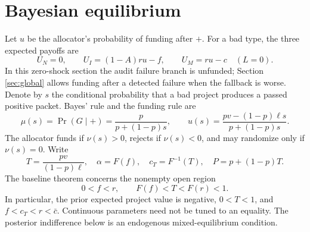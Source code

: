 \documentclass[11pt]{article}
\begin{document}
\section{Bayesian equilibrium}\label{sec:eq}
Let $u$ be the allocator's probability of funding after $+$. For a bad type, the three expected payoffs are
\begin{equation}U_N=0,\qquad U_I=(1-A)ru-f,\qquad U_M=ru-c\quad(L=0).\label{eq:payoffs}\end{equation}
In this zero-shock section the audit failure branch is unfunded; Section \ref{sec:global} allows funding after a detected failure when the fallback is worse. Denote by $s$ the conditional probability that a bad project produces a passed positive packet. Bayes' rule and the funding rule are
\begin{equation}\mu(s)=\Pr(G\mid+)=\frac{p}{p+(1-p)s},\qquad
u(s)=\frac{pv-(1-p)\ell s}{p+(1-p)s}.\label{eq:posterior}\end{equation}
The allocator funds if $\nu(s)>0$, rejects if $\nu(s)<0$, and may randomize only if $\nu(s)=0$. Write
\begin{equation}T=\frac{pv}{(1-p)\ell},\quad \alpha=F(f),\quad c_T=F^{-1}(T),\quad P=p+(1-p)T.\label{eq:primitives}\end{equation}
The baseline theorem concerns the nonempty open region
\begin{equation}0<f<r,\qquad F(f)<T<F(r)<1.\tag{R}\label{eq:region}\end{equation}
In particular, the prior expected project value is negative, $0<T<1$, and $f<c_T<r<\bar c$. Continuous parameters need not be tuned to an equality. The posterior indifference below is an endogenous mixed-equilibrium condition.
\end{document}
